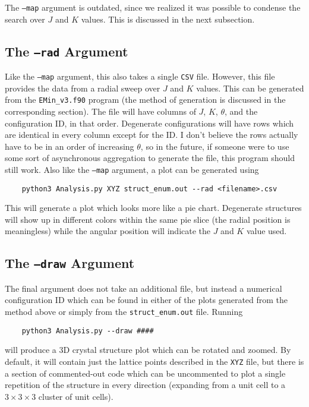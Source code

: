 \documentclass[12pt]{article}
\begin{document}
The \texttt{--map} argument is outdated, since we realized it was possible to condense the search over $ J $ and $ K $ values. This is discussed in the next subsection.

\subsection{The \texttt{--rad} Argument}

Like the \texttt{--map} argument, this also takes a single \texttt{CSV} file. However, this file provides the data from a radial sweep over $ J $ and $ K $ values. This can be generated from the \texttt{EMin\_v3.f90} program (the method of generation is discussed in the corresponding section). The file will have columns of $ J $, $ K $, $ \theta $, and the configuration ID, in that order. Degenerate configurations will have rows which are identical in every column except for the ID. I don't believe the rows actually have to be in an order of increasing $ \theta $, so in the future, if someone were to use some sort of asynchronous aggregation to generate the file, this program should still work. Also like the \texttt{--map} argument, a plot can be generated using
\begin{verbatim}
    python3 Analysis.py XYZ struct_enum.out --rad <filename>.csv
\end{verbatim}

This will generate a plot which looks more like a pie chart. Degenerate structures will show up in different colors within the same pie slice (the radial position is meaningless) while the angular position will indicate the $ J $ and $ K $ value used.

\subsection{The \texttt{--draw} Argument}

The final argument does not take an additional file, but instead a numerical configuration ID which can be found in either of the plots generated from the method above or simply from the \texttt{struct\_enum.out} file. Running
\begin{verbatim}
    python3 Analysis.py --draw ####
\end{verbatim}
will produce a 3D crystal structure plot which can be rotated and zoomed. By default, it will contain just the lattice points described in the \texttt{XYZ} file, but there is a section of commented-out code which can be uncommented to plot a single repetition of the structure in every direction (expanding from a unit cell to a $ 3 \times 3 \times 3 $ cluster of unit cells).
\end{document}
